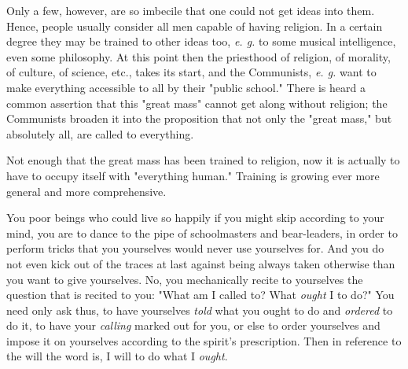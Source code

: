 \documentclass[a4paper]{book}
\begin{document}
Only a few, however, are so imbecile that one could not get ideas into them. 
Hence, people usually consider all men capable of having religion. In a 
certain degree they may be trained to other ideas too, \textit{e. g.} to some 
musical intelligence, even some philosophy. At this point then the priesthood 
of religion, of morality, of culture, of science, etc., takes its start, and 
the Communists, \textit{e. g.} want to make everything accessible to all by 
their "{}public school."{} There is heard a common assertion that this 
"{}great mass"{} cannot get along without religion; the Communists broaden it 
into the proposition that not only the "{}great mass,"{} but absolutely all, 
are called to everything.

Not enough that the great mass has been trained to religion, now it is 
actually to have to occupy itself with "{}everything human."{} Training is 
growing ever more general and more comprehensive.

You poor beings who could live so happily if you might skip according to your 
mind, you are to dance to the pipe of schoolmasters and bear-leaders, in order 
to perform tricks that you yourselves would never use yourselves for. And you 
do not even kick out of the traces at last against being always taken 
otherwise than you want to give yourselves. No, you mechanically recite to 
yourselves the question that is recited to you: "{}What am I called to? What 
\textit{ought} I to do?"{} You need only ask thus, to have yourselves 
\textit{told} what you ought to do and \textit{ordered} to do it, to have your 
\textit{calling} marked out for you, or else to order yourselves and impose it 
on yourselves according to the spirit's prescription. Then in reference to the 
will the word is, I will to do what I \textit{ought}.
\end{document}
